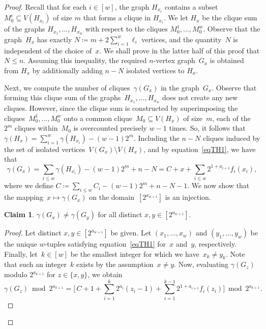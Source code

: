 \documentclass[11pt, final]{article}
\theoremstyle{definition}
\newtheorem{claim}{Claim}[theorem]
\newcommand{\oldqed}{}
\def\endofClaim{\hfill\scalebox{.6}{$\Box$}}
\newenvironment{claimproof}[1][Proof]{
  \renewcommand{\oldqed}{\qedsymbol}
  \renewcommand{\qedsymbol}{\endofClaim}
  \begin{proof}[#1]}
  {\end{proof}
  \renewcommand{\qedsymbol}{\oldqed}}
\begin{document}
\begin{proof}
    Recall that for each $i \in [w]$, the graph $H_{x_i}$ contains a subset $M^i_0\subseteq V(H_{x_i})$ of size $m$ that forms a clique in $H_{x_i}$. We let $H_x$ be the clique sum of the graphs $H_{x_1}, \dots, H_{x_w}$ with respect to the cliques $M_0^1, \dots, M_0^w$. Observe that the graph~$H_x$ has exactly  $N \coloneqq m+2\sum_{i=1}^w \ell_i$ vertices, and the quantity~$N$ is independent of the choice of~$x$. We shall prove in the latter half of this proof that $N \leq n$. Assuming this inequality, the required $n$-vertex graph~$G_x$ is obtained from $H_x$ by additionally adding $n-N$ isolated vertices to $H_x$. 

    Next, we compute the number of cliques~$\gamma(G_x)$ in the graph~$G_x$. Observe that forming this clique sum of the graphs~$H_{x_1}, \dots, H_{x_w}$ does not create any new cliques. However, since the clique sum is constructed by superimposing the cliques~$M_0^1, \dots, M_0^w$ onto a common clique~$M_0 \subseteq V(H_x)$ of size~$m$, each of the~$2^m$ cliques within~$M_0$ is overcounted precisely $w-1$ times. So, it follows that $\gamma(H_x) = \sum_{i =1}^w \gamma(H_{x_i}) - (w-1)2^m$. Including the $n -N$ cliques induced by the set of isolated vertices~$V(G_x) \setminus  V(H_x)$, and by equation~\eqref{eqTH1}, we have that
    $$\gamma(G_x) = \sum_{i\leq w} \gamma(H_{x_i})  - (w-1)2^m + n-N = C+x+\sum_{i\leq w}2^{1+a_{i+1}}f_i(x_i),$$
    where we define $C\coloneqq \sum_{i\leq w} C_i - (w-1)2^m + n - N - 1$. We now show that the mapping~$x \mapsto \gamma(G_x)$ on the domain~$[2^{a_{w+1}}]$ is an injection.
    
    \begin{claim}\label{clm:injection}
        $\gamma(G_x)\neq \gamma(G_y)$ for all distinct $x,y\in [2^{a_{w+1}}]$.
    \end{claim}
    
    \begin{claimproof}
        Let distinct $x, y \in [2^{a_{w+1}}]$ be given. Let $(x_1, \dots, x_w)$ and $(y_1, \dots, y_w)$ be the unique $w$-tuples satisfying equation~\eqref{eqTH1}  for~$x$ and~$y$, respectively. Finally, let~$k \in [w]$ be the smallest integer for which we have~$x_k \neq y_k$. Note that such an integer~$k$ exists by the assumption~$x \neq y$. Now, evaluating $\gamma(G_z)$ modulo $2^{a_{k+1}}$ for $z \in \{x, y\}$, we obtain 
        \begin{equation}
            \gamma (G_z) \bmod{2^{a_{k+1}}} = \Biggl[\, C + 1 + \sum_{i = 1}^k 2^{a_i}(z_i -1) + \sum_{i = 1}^{k-1} 2^{1 + a_{i+1}} f_i(z_i) \Biggr] \bmod{2^{a_{k+1}}}. \label{eqTH2}
        \end{equation}


\end{claimproof}
\end{proof}
\end{document}
